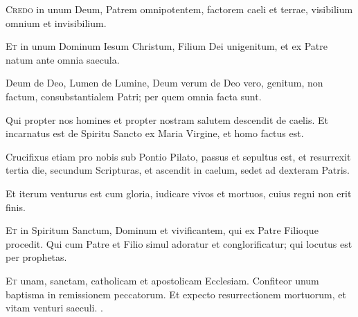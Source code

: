 \documentclass[20pt]{extarticle}
\begin{document}
    \lettrine{C}{redo} in unum Deum,
    Patrem omnipotentem,
    factorem caeli et terrae,
    visibilium omnium et invisibilium.

    \lettrine{E}{t} in unum Dominum Iesum Christum,
    Filium Dei unigenitum,
    et ex Patre natum ante omnia saecula.
    
    Deum de Deo, Lumen de Lumine, Deum verum de Deo vero, 
    genitum, non factum, consubstantialem Patri;
    per quem omnia facta sunt.
    
    Qui propter nos homines et propter nostram salutem
    descendit de caelis.
    Et incarnatus est de Spiritu Sancto ex Maria Virgine, et homo factus est.
    
    Crucifixus etiam pro nobis sub Pontio Pilato,
    passus et sepultus est,
    et resurrexit tertia die, secundum Scripturas,
    et ascendit in caelum, sedet ad dexteram Patris.
    
    Et iterum venturus est cum gloria,
    iudicare vivos et mortuos,
    cuius regni non erit finis.

    \lettrine{E}{t} in Spiritum Sanctum, Dominum et vivificantem,
    qui ex Patre Filioque procedit.
    Qui cum Patre et Filio simul adoratur et conglorificatur;
    qui locutus est per prophetas.

    \lettrine{E}{t} unam, sanctam, catholicam et apostolicam Ecclesiam.
    Confiteor unum baptisma in remissionem peccatorum.
    Et expecto resurrectionem mortuorum,
    et vitam venturi saeculi.
    \amen.
\end{document}
